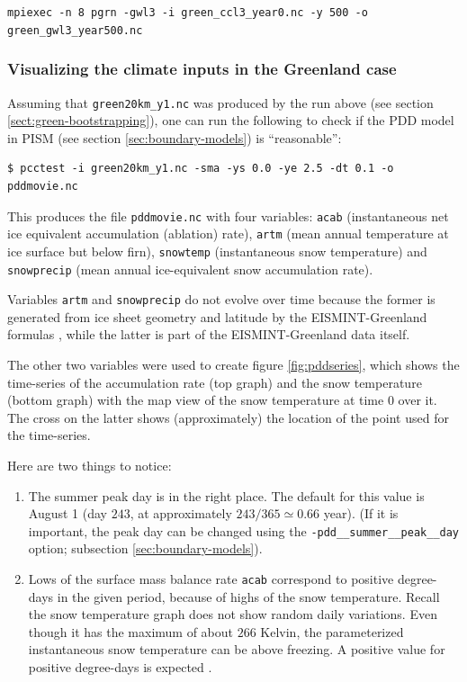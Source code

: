 \documentclass[11pt,final]{amsart}
\newcommand{\und}{\_\!\_}
\begin{document}
\verb|mpiexec -n 8 pgrn -gwl3 -i green_ccl3_year0.nc -y 500 -o green_gwl3_year500.nc|

\subsubsection*{Visualizing the climate inputs in the Greenland case}
\label{sec:pdd-series-with-pcctest}

Assuming that \verb|green20km_y1.nc| was produced by the run above (see section
\ref{sect:green-bootstrapping}), one can run the following to check if the PDD
model in PISM (see section \ref{sec:boundary-models}) is ``reasonable'':
\begin{verbatim}
$ pcctest -i green20km_y1.nc -sma -ys 0.0 -ye 2.5 -dt 0.1 -o pddmovie.nc
\end{verbatim}
This produces the file \verb|pddmovie.nc| with four variables: \verb|acab|
(instantaneous net ice equivalent accumulation (ablation) rate), \verb|artm|
(mean annual temperature at ice surface but below firn), \verb|snowtemp|
(instantaneous snow temperature) and \verb|snowprecip| (mean annual
ice-equivalent snow accumulation rate).

Variables \verb|artm| and \verb|snowprecip| do not evolve over time because the 
former is generated from ice sheet geometry and latitude by the EISMINT-Greenland
formulas \cite{RitzEISMINT}, while the latter is part of the EISMINT-Greenland data
itself.

The other two variables were used to create figure \ref{fig:pddseries}, which
shows the time-series of the accumulation rate (top graph) and the snow
temperature (bottom graph) with the map view of the snow temperature at time 0
over it. The cross on the latter shows (approximately) the location of the
point used for the time-series.

Here are two things to notice:
\begin{enumerate}
\item The summer peak day is in the right place.  The default for this value is
  August 1 (day $243$, at approximately $243/365 \simeq 0.66$ year).  (If it is
  important, the peak day can be changed using the \texttt{-pdd\und summer\und peak\und day}
  option; subsection \ref{sec:boundary-models}).

\item Lows of the surface mass balance rate \verb|acab| correspond to 
  positive degree-days in the given period, because of highs of the snow 
  temperature.  Recall the snow temperature graph does
  not show random daily variations.  Even though it has the maximum of about $266$
  Kelvin, the parameterized instantaneous snow temperature can be above freezing.
  A positive value for positive degree-days is expected \cite{CalovGreve05}.
\end{enumerate}
\end{document}
